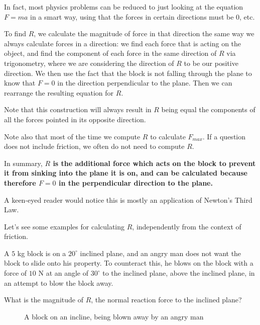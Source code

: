 In fact, most physics problems can be reduced to just looking at the equation $F=ma$ in a smart way, using that the forces in certain directions must be $0$, etc.

To find $R$, we calculate the magnitude of force in that direction the same way we always calculate forces in a direction: we find each force 
that is acting on the object, and find the component of each force in the same direction of $R$ via trigonometry, where we are considering the direction of $R$ to be our positive direction.
We then use the fact that the block is not falling through the plane to know that $F=0$ in the direction perpendicular to the plane. Then we can rearrange the resulting equation for $R$.

Note that this construction will always result in $R$ being equal the components of all the forces pointed in its opposite direction.

Note also that most of the time we compute $R$ to calculate $F_{max}$. If a question does not include friction, we often do not need to compute $R$.

In summary, \textbf{$R$ is the additional force which acts on the block to prevent it from sinking into the plane it is on, and can be calculated because therefore $F=0$ in the perpendicular direction to the plane.}

A keen-eyed reader would notice this is mostly an application of Newton's Third Law.

Let's see some examples for calculating $R$, independently from the context of friction.

\begin{example}
    A $5$ kg block is on a $20^\circ$ inclined plane, and an angry man does not want the block to slide onto his property. To counteract this, he blows on the block 
    with a force of $10$ N  
    at an angle of $30^\circ$ to the inclined plane, above the inclined plane, in an attempt to blow the block away.

    What is the magnitude of $R$, the normal reaction force to the inclined plane? 

    \begin{figure}[H]
        \centering
        \caption{A block on an incline, being blown away by an angry man}
        \label{fig:block-on-plane-man}
    \end{figure}
\end{example}

